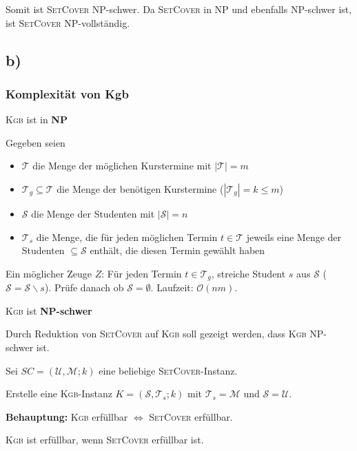 \documentclass{article}
\begin{document}
\bigskip 

Somit ist \textsc{SetCover} NP-schwer. Da \textsc{SetCover} in NP und ebenfalls NP-schwer ist, ist \textsc{SetCover} NP-vollständig.


\subsection*{b)}
\subsubsection*{Komplexität von Kgb}
\textsc{Kgb} ist in \textbf{NP}

Gegeben seien
\begin{itemize}
	\item $\mathcal{T}$ die Menge der möglichen Kurstermine mit $|\mathcal{T}| = m$
  \item $\mathcal{T}_g \subseteq \mathcal{T}$ die Menge der benötigen Kurstermine ($|\mathcal{T}_g| = k \leq m$)
  \item $\mathcal{S}$ die Menge der Studenten mit $|\mathcal{S}| = n$
  \item $\mathcal{T}_s$ die Menge, die für jeden möglichen Termin $t \in \mathcal{T}$ jeweils eine Menge der Studenten $\subseteq \mathcal{S}$ enthält, die diesen Termin gewählt haben
\end{itemize}

Ein möglicher Zeuge $Z$: Für jeden Termin $t \in \mathcal{T}_g$, streiche Student $s$ aus $\mathcal{S}$ ($\mathcal{S}=\mathcal{S}\backslash s$). Prüfe  danach ob $\mathcal{S} = \emptyset$. Laufzeit: $\mathcal{O}(nm)$.

\bigskip

\textsc{Kgb} ist \textbf{NP-schwer}

Durch Reduktion von \textsc{SetCover} auf \textsc{Kgb} soll gezeigt werden, dass \textsc{Kgb} NP-schwer ist.

\smallskip

Sei $SC = (\mathcal{U, M}; k)$ eine beliebige \textsc{SetCover}-Instanz.

Erstelle eine \textsc{Kgb}-Instanz $K = (\mathcal{S}, \mathcal{T}_s; k)$ mit $\mathcal{T}_s = \mathcal{M}$ und $\mathcal{S} = \mathcal{U}$. 

\smallskip

\textbf{Behauptung:} \textsc{Kgb} erfüllbar $\Leftrightarrow$ \textsc{SetCover} erfüllbar.

\smallskip

\textsc{Kgb} ist erfüllbar, wenn \textsc{SetCover} erfüllbar ist.
\end{document}

